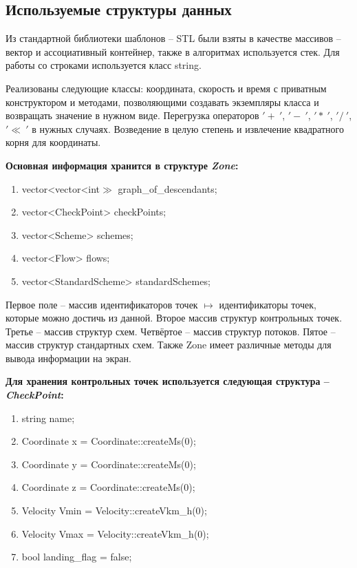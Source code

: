 \documentclass[12pt, a4 paper]{article}
\theoremstyle{plain}
\begin{document}
\newpage


\subsection*{Используемые структуры данных}

Из стандартной библиотеки шаблонов – STL были взяты в качестве массивов – вектор и ассоциативный контейнер, также в алгоритмах используется стек. Для работы со строками используется класс string.

Реализованы следующие классы: координата, скорость и время с приватным конструктором и методами, позволяющими создавать экземпляры класса и возвращать значение в нужном виде. Перегрузка операторов $ '+~'$, $'-~'$, $'\ast~'$, $'/~'$, $'\ll~'$ в нужных случаях. Возведение в целую степень и извлечение квадратного корня для координаты.

\textbf{Основная информация хранится в структуре \textit{Zone}:}
\begin{enumerate}
	\item vector<vector<int$\gg$ graph\_of\_descendants;
	\item vector<CheckPoint> checkPoints;
	\item vector<Scheme> schemes;
	\item vector<Flow> flows;
	\item vector<StandardScheme> standardSchemes;
\end{enumerate}


Первое поле – массив идентификаторов точек $\mapsto$ идентификаторы точек, которые можно достичь из данной. Второе массив структур контрольных точек. Третье – массив структур схем. Четвёртое – массив структур потоков. Пятое – массив структур стандартных схем. Также Zone имеет различные методы для вывода информации на экран.


\textbf{Для хранения контрольных точек используется следующая структура – \textit{CheckPoint}:}

\begin{enumerate}
	\item string name;
	\item Coordinate x = Coordinate::createMs(0);
	\item Coordinate y = Coordinate::createMs(0);
	\item Coordinate z = Coordinate::createMs(0);
	\item Velocity Vmin = Velocity::createVkm\_h(0);
	\item Velocity Vmax = Velocity::createVkm\_h(0);
	\item bool landing\_flag = false;
\end{enumerate}
\end{document}
